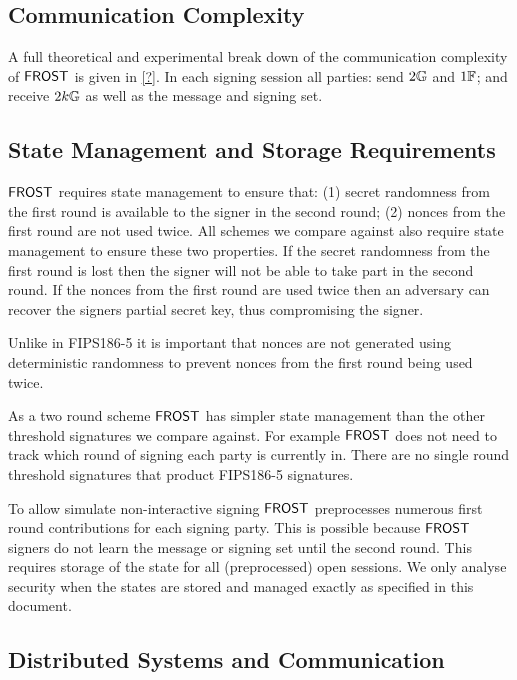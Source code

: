 \subsection{Communication Complexity}\label{section:comparisons:communicationcomplexity}
A full theoretical and experimental break down of the communication complexity of $\mathsf{FROST}$ is given in \cref{?}.
In each signing session all parties:  send $2 \mathbb{G}$ and $1 \mathbb{F}$; and receive $2 k \mathbb{G}$ as well as the message and signing set.

\subsection{State Management and Storage Requirements}\label{section:comparisons:statemanagement}
$\mathsf{FROST}$ requires state management to ensure that:
(1) secret randomness from the first round is available to the signer in the second round;
(2) nonces from the first round are not used twice.
All schemes we compare against also require state management to ensure these two properties.
If the secret randomness from the first round is lost then the signer will not be able to take part in the second round.
If the nonces from the first round are used twice then an adversary can recover the signers partial secret key,
thus compromising the signer.

Unlike in FIPS186-5 it is important that nonces are not generated using deterministic randomness to prevent nonces from the first round being used twice.

As a two round scheme $\mathsf{FROST}$ has simpler state management than the other threshold signatures we compare against.
For example $\mathsf{FROST}$ does not need to track which round of signing each party is currently in.
There are no single round threshold signatures that product FIPS186-5 signatures.

To allow simulate non-interactive signing $\mathsf{FROST}$ preprocesses numerous first round contributions for each signing party.
This is possible because $\mathsf{FROST}$ signers do not learn the message or signing set until the second round.
This requires storage of the state for all (preprocessed) open sessions.
We only analyse security when the states are stored and managed exactly as specified in this document.

\subsection{Distributed Systems and Communication}



